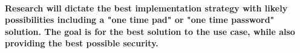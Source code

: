 \documentclass[12pt,a4paper]{article}
\begin{document}
\paragraph{Research will dictate the best implementation strategy with likely possibilities including a "one time pad" or "one time password" solution. The goal is for the best solution to the use case, while also providing the best possible security.}
%

%
\end{document}
